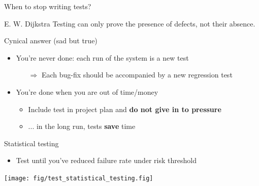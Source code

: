 \begin{frame}[fragile]{When to stop writing tests?}
  \begin{boitequote}{E. W. Dijkstra}
    Testing can only prove the presence of defects, not their absence.
  \end{boitequote}
  
  \begin{block}{Cynical answer (sad but true)}
    \begin{itemize}
    \item You're never done: each run of the system is a new test
      \begin{itemize}
      \item[$\Rightarrow$] Each bug-fix should be accompanied by a new
        regression test
      \end{itemize}       
    \item You're done when you are out of time/money
      \begin{itemize}
      \item Include test in project plan and \textbf{do not give in to pressure}
      \item ... in the long run, tests \textbf{save} time
      \end{itemize}
    \end{itemize}
  \end{block}

  \begin{block}{Statistical testing}
    \begin{itemize}
    \item Test until you've reduced failure rate under risk threshold
    \end{itemize}
    \centerline{\texttt{[image: fig/test\_statistical\_testing.fig]}}
  \end{block}
\end{frame}
